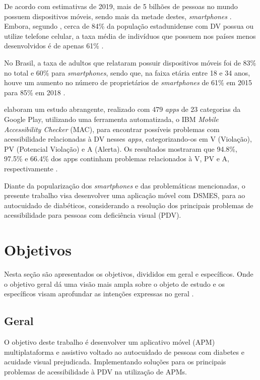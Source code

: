 De acordo com estimativas de 2019, mais de 5 bilhões de pessoas no mundo possuem dispositivos móveis, sendo mais da metade destes, \textit{smartphones}
\cite{Taylor2019}. Embora, segundo , cerca de 84\% da população estadunidense com DV possua ou utilize telefone celular,
a taxa média de indivíduos que possuem nos países menos desenvolvidos é de apenas 61\% \cite{ITU_2021}.

No Brasil, a taxa de adultos que relataram possuir dispositivos móveis foi de 83\% no total e 60\% para \textit{smartphones},
sendo que, na faixa etária entre 18 e 34 anos, houve um aumento no número de proprietários de \textit{smartphones} de
61\% em 2015 para 85\% em 2018 \cite{Taylor2019}.

 elaboram um estudo abrangente, realizado com 479 \textit{apps} de 23 categorias da
Google Play, utilizando uma ferramenta automatizada, o IBM \textit{Mobile Accessibility Checker}
(MAC), para encontrar possíveis problemas com acessibilidade relacionadas à DV nesses \textit{apps},
categorizando-os em V (Violação), PV (Potencial Violação) e A (Alerta). Os resultados mostraram que 94.8\%, 97.5\% e 66.4\% dos apps continham problemas
relacionados à V, PV e A, respectivamente \cite{Yan2019}.

Diante da popularização dos \emph{smartphones} e das problemáticas mencionadas, o presente trabalho visa desenvolver uma aplicação móvel
com DSMES, para ao autocuidado de diabéticos, considerando a resolução dos principais problemas de acessibilidade para pessoas com
deficiência visual (PDV).

\section{Objetivos}

Nesta seção são apresentados os objetivos, divididos em geral e específicos. Onde o objetivo geral dá uma visão mais ampla sobre o objeto
de estudo e os específicos visam aprofundar as intenções expressas no geral \cite{cervo2006metodologia}.

\subsection{Geral}

O objetivo deste trabalho é desenvolver um aplicativo móvel (APM) multiplataforma e assistivo voltado ao autocuidado de pessoas com diabetes
e acuidade visual prejudicada. Implementando soluções para os principais problemas de acessibilidade à PDV na utilização de APMs.

